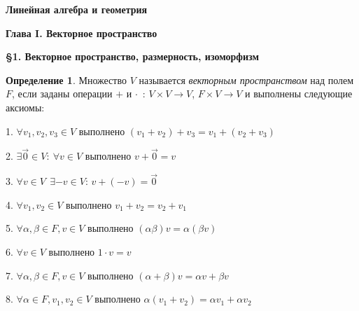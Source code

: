 \documentclass[a4paper, 12pt]{article}
\theoremstyle{definition}
\newtheorem*{definition}{Определение}
\begin{document}
    \fontsize{14pt}{20pt}\selectfont
    \begin{center}
        \begin{LARGE}
            \textbf{Линейная алгебра и геометрия}
        \end{LARGE}

        \begin{Large}
            \textbf{Глава I. Векторное пространство}
            
            \textbf{\S1. Векторное пространство, размерность, изоморфизм}
        \end{Large}
    \end{center}

    \begin{definition}
        Множество $V$ называется
        \textit{векторным пространством}
        над полем $F$, если заданы операции $+$ и $\cdot$\ :
        $V\times V \to V$, $F \times V \to V$ 
        и выполнены следующие аксиомы: 

        1. $\forall v_1, v_2, v_3\in V$ выполнено
        $(v_1 + v_2) + v_3 = v_1 + (v_2 + v_3)$

        2. $\exists \vec 0 \in V:\ \forall v \in V$
        выполнено $v + \vec 0 = v$

        3. $\forall v \in V \ \ \exists  -v  \in V$:
        $v + (-v) = \vec 0$

        4. $\forall v_1, v_2 \in V$ выполнено 
        $v_1 + v_2 = v_2 + v_1$

        5. $\forall \alpha, \beta \in F, v \in V$ 
        выполнено $(\alpha \beta)v = \alpha (\beta v)$

        6. $\forall v \in V$ выполнено $1 \cdot v = v$

        7. $\forall \alpha, \beta \in F, v \in V$ выполнено
        $(\alpha + \beta)v = \alpha v + \beta v$

        8. $\forall \alpha \in F, v_1, v_2 \in V$ выполнено
        $\alpha (v_1 + v_2) = \alpha v_1 + \alpha v_2$        
    \end{definition}
\end{document}

